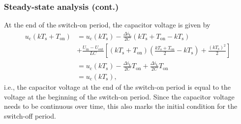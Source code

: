 \begin{frame}
    \frametitle{Steady-state analysis (cont.)}
    At the end of the switch-on period, the capacitor voltage is given by
    \begin{equation}
        \begin{split}
            u_\mathrm{c}(k T_\mathrm{s} + T_\mathrm{on}) &= u_\mathrm{c}(k T_\mathrm{s}) -\frac{\Delta i_\mathrm{L}}{2 C}(k T_\mathrm{s} + T_\mathrm{on}- kT_\mathrm{s}) \\&+ \frac{U_\mathrm{in}-U_\mathrm{out}}{LC} \left[(k T_\mathrm{s} + T_\mathrm{on})(\frac{k T_\mathrm{s} + T_\mathrm{on}}{2}-kT_\mathrm{s}) + \frac{(kT_\mathrm{s})^2}{2}\right]\\
            &= u_\mathrm{c}(k T_\mathrm{s}) - \frac{\Delta i_\mathrm{L}}{2 C}T_\mathrm{on} +\frac{\Delta i_\mathrm{L}}{2 C}T_\mathrm{on}\\
            &= u_\mathrm{c}(k T_\mathrm{s}),
        \end{split}
        \label{eq:capacitor-voltage-switch-on-step-down-converter-end}
    \end{equation}
    i.e., the capacitor voltage at the end of the switch-on period is equal to the voltage at the beginning of the switch-on period. Since the capacitor voltage needs to be continuous over time, this also marks the initial condition for the switch-off period.
\end{frame}

